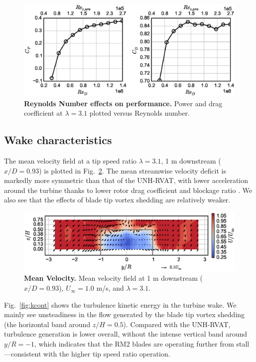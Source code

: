 \documentclass[10pt,letterpaper]{article}
\begin{document}
\begin{figure}[h]
\includegraphics[width=\textwidth]{figures/perf_re_dep}
\caption{{\bf Reynolds Number effects on performance.}
Power and drag coefficient at $\lambda=3.1$ plotted versus Reynolds number.}
\label{fig:cp-re-dep}
\end{figure}


\subsection*{Wake characteristics}

The mean velocity field at a tip speed ratio $\lambda=3.1$, 1 m downstream
($x/D=0.93$) is plotted in Fig.~\ref{fig:meancontquiv}. The mean streamwise
velocity deficit is markedly more symmetric than that of the UNH-RVAT, with
lower acceleration around the turbine thanks to lower rotor drag coefficient and
blockage ratio \cite{Bachant2015-JoT}. We also see that the effects of blade tip
vortex shedding are relatively weaker.

\begin{figure}[h]
\includegraphics[width=\textwidth]{figures/meancontquiv}
\caption{{\bf Mean Velocity.}
Mean velocity field at 1 m downstream ($x/D=0.93$), $U_\infty=1.0$ m/s, and
$\lambda=3.1$.}
\label{fig:meancontquiv}
\end{figure}


Fig.~\ref{fig:kcont} shows the turbulence kinetic energy in the turbine wake. We
mainly see unsteadiness in the flow generated by the blade tip vortex shedding
(the horizontal band around $z/H=0.5$). Compared with the UNH-RVAT, turbulence
generation is lower overall, without the intense vertical band around $y/R=-1$,
which indicates that the RM2 blades are operating further from
stall---consistent with the higher tip speed ratio operation.
\end{document}
